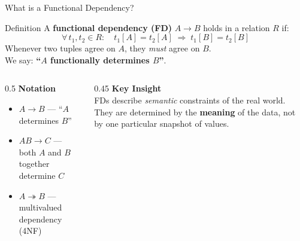 \begin{frame}{What is a Functional Dependency?}
  \begin{block}{Definition}
    A \textbf{functional dependency (FD)} $A \to B$ holds in a relation $R$ if:
    \[
      \forall\, t_1, t_2 \in R:\quad t_1[A] = t_2[A] \;\Rightarrow\; t_1[B] = t_2[B]
    \]
    Whenever two tuples agree on $A$, they \emph{must} agree on $B$.\\
    We say: \textbf{``$A$ functionally determines $B$''}.
  \end{block}

  \begin{columns}[t]
    \begin{column}{0.5\textwidth}
      \textbf{Notation}
      \begin{itemize}
        \item $A \to B$ \quad --- ``$A$ determines $B$''
        \item $AB \to C$ \quad --- both $A$ and $B$ together determine $C$
        \item $A \twoheadrightarrow B$ \quad --- multivalued dependency (4NF)
      \end{itemize}
    \end{column}
    \begin{column}{0.45\textwidth}
      \textbf{Key Insight}\\
      FDs describe \emph{semantic} constraints of the real world.
      They are determined by the \textbf{meaning} of the data, not by one
      particular snapshot of values.
    \end{column}
  \end{columns}
\end{frame}

